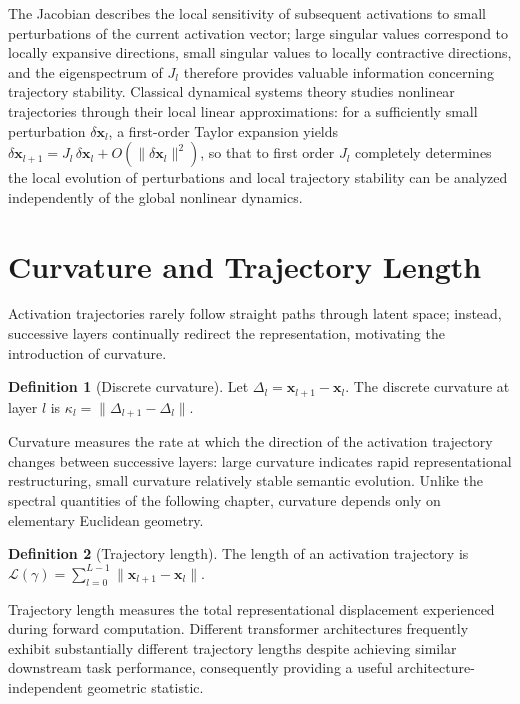 \documentclass[11pt,twoside,openright]{book}
\numberwithin{equation}{chapter}
\theoremstyle{definition}
\newtheorem{definition}{Definition}[chapter]
\theoremstyle{plain}
\theoremstyle{remark}
\theoremstyle{definition}
\begin{document}
The Jacobian describes the local sensitivity of subsequent activations to
small perturbations of the current activation vector; large singular
values correspond to locally expansive directions, small singular values
to locally contractive directions, and the eigenspectrum of $J_l$
therefore provides valuable information concerning trajectory stability.
Classical dynamical systems theory studies nonlinear trajectories through
their local linear approximations: for a sufficiently small perturbation
$\delta\mathbf{x}_l$, a first-order Taylor expansion yields
$\delta\mathbf{x}_{l+1}=J_l\,\delta\mathbf{x}_l+O(\|\delta\mathbf{x}_l\|^2)$,
so that to first order $J_l$ completely determines the local evolution of
perturbations and local trajectory stability can be analyzed
independently of the global nonlinear dynamics.

\section{Curvature and Trajectory Length}

Activation trajectories rarely follow straight paths through latent
space; instead, successive layers continually redirect the
representation, motivating the introduction of curvature.

\begin{definition}[Discrete curvature]
Let $\Delta_l=\mathbf{x}_{l+1}-\mathbf{x}_l$. The discrete curvature at
layer $l$ is $\kappa_l=\|\Delta_{l+1}-\Delta_l\|$.
\end{definition}

Curvature measures the rate at which the direction of the activation
trajectory changes between successive layers: large curvature indicates
rapid representational restructuring, small curvature relatively stable
semantic evolution. Unlike the spectral quantities of the following
chapter, curvature depends only on elementary Euclidean geometry.

\begin{definition}[Trajectory length]
The length of an activation trajectory is
$\mathcal{L}(\gamma)=\sum_{l=0}^{L-1}\|\mathbf{x}_{l+1}-\mathbf{x}_l\|$.
\end{definition}

Trajectory length measures the total representational displacement
experienced during forward computation. Different transformer
architectures frequently exhibit substantially different trajectory
lengths despite achieving similar downstream task performance,
consequently providing a useful architecture-independent geometric
statistic.
\end{document}
